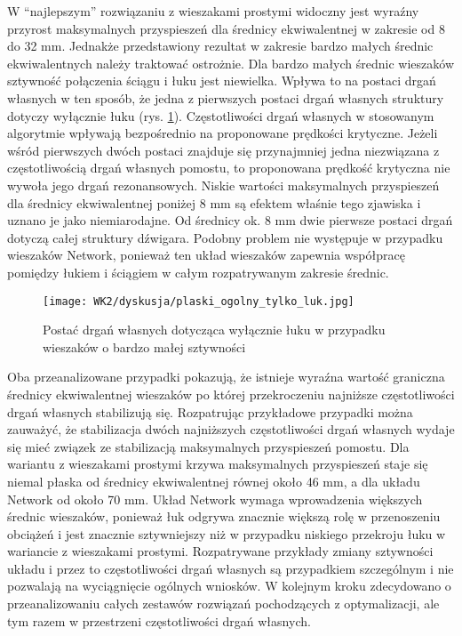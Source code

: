 W \enquote{najlepszym} rozwiązaniu z wieszakami prostymi widoczny jest wyraźny przyrost maksymalnych przyspieszeń dla średnicy ekwiwalentnej w zakresie od 8 do 32 mm. Jednakże przedstawiony rezultat w zakresie bardzo małych średnic ekwiwalentnych należy traktować ostrożnie. Dla bardzo małych średnic wieszaków sztywność połączenia ściągu i łuku jest niewielka. Wpływa to na postaci drgań własnych w ten sposób, że jedna z pierwszych postaci drgań własnych struktury dotyczy wyłącznie łuku (rys. \ref{fig:small_stiff_hangers_mode_shape}). Częstotliwości drgań własnych w stosowanym algorytmie wpływają bezpośrednio na proponowane prędkości krytyczne. Jeżeli wśród pierwszych dwóch postaci znajduje się przynajmniej jedna niezwiązana z częstotliwością drgań własnych pomostu, to proponowana prędkość krytyczna nie wywoła jego drgań rezonansowych. Niskie wartości maksymalnych przyspieszeń dla średnicy ekwiwalentnej poniżej 8 mm są efektem właśnie tego zjawiska i uznano je jako niemiarodajne. Od średnicy ok. 8 mm dwie pierwsze postaci drgań dotyczą całej struktury dźwigara. Podobny problem nie występuje w przypadku wieszaków Network, ponieważ ten układ wieszaków zapewnia współpracę pomiędzy łukiem i ściągiem w całym rozpatrywanym zakresie średnic.

\begin{figure}[hbt!]
	\centering
	\texttt{[image: WK2/dyskusja/plaski\_ogolny\_tylko\_luk.jpg]}
	\captionsetup{justification=centering}
	\caption{Postać drgań własnych dotycząca wyłącznie łuku w przypadku wieszaków o bardzo małej sztywności}
	\label{fig:small_stiff_hangers_mode_shape}
\end{figure}


Oba przeanalizowane przypadki pokazują, że istnieje wyraźna wartość graniczna średnicy ekwiwalentnej wieszaków po której przekroczeniu najniższe częstotliwości drgań własnych stabilizują się. Rozpatrując przykładowe przypadki można zauważyć, że stabilizacja dwóch najniższych częstotliwości drgań własnych wydaje się mieć związek ze stabilizacją maksymalnych przyspieszeń pomostu. Dla wariantu z wieszakami prostymi krzywa maksymalnych przyspieszeń staje się niemal płaska od średnicy ekwiwalentnej równej około 46 mm, a dla układu Network od około 70 mm. Układ Network wymaga wprowadzenia większych średnic wieszaków, ponieważ łuk odgrywa znacznie większą rolę w przenoszeniu obciążeń i jest znacznie sztywniejszy niż w przypadku niskiego przekroju łuku w wariancie z wieszakami prostymi. Rozpatrywane przykłady zmiany sztywności układu i przez to częstotliwości drgań własnych są przypadkiem szczególnym i nie pozwalają na wyciągnięcie ogólnych wniosków. W kolejnym kroku zdecydowano o przeanalizowaniu całych zestawów rozwiązań pochodzących z optymalizacji, ale tym razem w przestrzeni częstotliwości drgań własnych.

